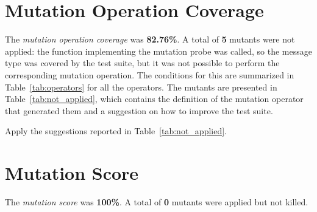 \section{Mutation Operation Coverage}

The \emph{mutation operation coverage} was \textbf{82.76\%}. A total of \textbf{5} mutants were not applied: the function implementing the mutation probe was called, so the message type was covered by the test suite, but it was not possible to perform the corresponding mutation operation.
The conditions for this are summarized in Table~\ref{tab:operators} for all the operators.
The mutants are presented in Table~\ref{tab:not_applied}, which contains the definition of the mutation operator that generated them and a suggestion on how to improve the test suite.

\action Apply the suggestions reported in Table~\ref{tab:not_applied}.

 


\section{Mutation Score}

The \emph{mutation score} was \textbf{100\%}. A total of \textbf{0} mutants were applied but not killed.
